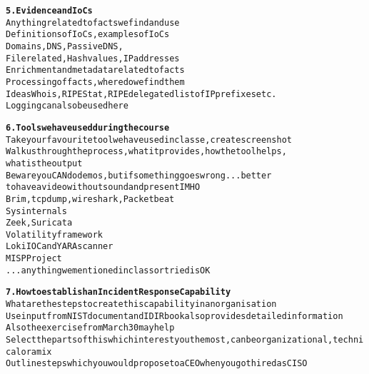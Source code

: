 \documentclass[Screen16to9,17pt]{foils}
\begin{document}


\begin{alltt}
{\bf 5. Evidence and IoCs}\\

Anything related to facts we find and use
Definitions of IoCs, examples of IoCs
Domains, DNS, Passive DNS,
File related, Hash values, IP addresses
Enrichment and metadata related to facts
Processing of facts, where do we find them
Ideas Whois, RIPE Stat, RIPE delegated list of IP prefixes etc.
Logging can also be used here
\end{alltt}




\begin{alltt}
{\bf 6. Tools we have used during the course}\\
Take your favourite tool we have used in classe, create screenshot
Walk us through the process, what it provides, how the tool helps,
what is the output
Beware you CAN do demos, but if something goes wrong ... better
to have a video without sound and present IMHO
Brim, tcpdump, wireshark, Packetbeat
Sysinternals
Zeek, Suricata
Volatility framework
Loki IOC and YARA scanner
MISP Project
... anything we mentioned in class or tried is OK
\end{alltt}



\begin{alltt}
{\bf 7. How to establish an Incident Response Capability}\\
What are the steps to create this capability in an organisation
Use input from NIST document and IDIR book also provides detailed information
Also the exercise from March 30 may help
Select the parts of this which interest you the most, can be organizational, technical or a mix
Outline steps which you would propose to a CEO when you got hired as CISO
\end{alltt}


\end{document}
